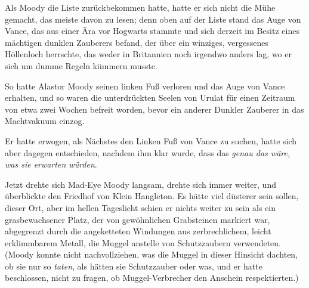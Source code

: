 Als Moody die Liste zurückbekommen hatte, hatte er sich nicht die Mühe gemacht, das meiste davon zu lesen; denn oben auf der Liste stand das Auge von Vance, das aus einer Ära vor Hogwarts stammte und sich derzeit im Besitz eines mächtigen dunklen Zauberers befand, der über ein winziges, vergessenes Höllenloch herrschte, das weder in Britannien noch irgendwo anders lag, wo er sich um dumme Regeln kümmern musste.

So hatte Alastor Moody seinen linken Fuß verloren und das Auge von Vance erhalten, und so waren die unterdrückten Seelen von Urulat für einen Zeitraum von etwa zwei Wochen befreit worden, bevor ein anderer Dunkler Zauberer in das Machtvakuum einzog.

Er hatte erwogen, als Nächstes den Linken Fuß von Vance zu suchen, hatte sich aber dagegen entschieden, nachdem ihm klar wurde, dass das \emph{genau das wäre, was sie erwarten würden}.

Jetzt drehte sich Mad-Eye Moody langsam, drehte sich immer weiter, und überblickte den Friedhof von Klein Hangleton. Es hätte viel düsterer sein sollen, dieser Ort, aber im hellen Tageslicht schien er nichts weiter zu sein als ein grasbewachsener Platz, der von gewöhnlichen Grabsteinen markiert war, abgegrenzt durch die angeketteten Windungen aus zerbrechlichem, leicht erklimmbarem Metall, die Muggel anstelle von Schutzzaubern verwendeten. (Moody konnte nicht nachvollziehen, was die Muggel in dieser Hinsicht dachten, ob sie nur so \emph{taten}, als hätten sie Schutzzauber oder was, und er hatte beschlossen, nicht zu fragen, ob Muggel-Verbrecher den Anschein respektierten.)

